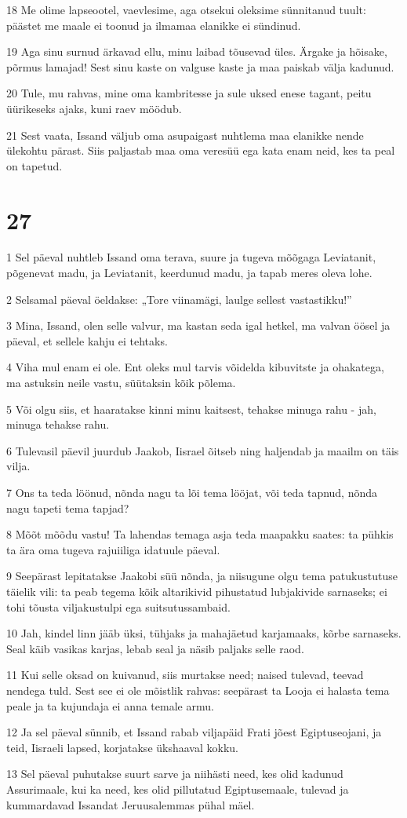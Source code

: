 \par 18 Me olime lapseootel, vaevlesime, aga otsekui oleksime sünnitanud tuult: päästet me maale ei toonud ja ilmamaa elanikke ei sündinud.
\par 19 Aga sinu surnud ärkavad ellu, minu laibad tõusevad üles. Ärgake ja hõisake, põrmus lamajad! Sest sinu kaste on valguse kaste ja maa paiskab välja kadunud.
\par 20 Tule, mu rahvas, mine oma kambritesse ja sule uksed enese tagant, peitu üürikeseks ajaks, kuni raev möödub.
\par 21 Sest vaata, Issand väljub oma asupaigast nuhtlema maa elanikke nende ülekohtu pärast. Siis paljastab maa oma veresüü ega kata enam neid, kes ta peal on tapetud.

\chapter{27}

\par 1 Sel päeval nuhtleb Issand oma terava, suure ja tugeva mõõgaga Leviatanit, põgenevat madu, ja Leviatanit, keerdunud madu, ja tapab meres oleva lohe.
\par 2 Selsamal päeval öeldakse: „Tore viinamägi, laulge sellest vastastikku!”
\par 3 Mina, Issand, olen selle valvur, ma kastan seda igal hetkel, ma valvan öösel ja päeval, et sellele kahju ei tehtaks.
\par 4 Viha mul enam ei ole. Ent oleks mul tarvis võidelda kibuvitste ja ohakatega, ma astuksin neile vastu, süütaksin kõik põlema.
\par 5 Või olgu siis, et haaratakse kinni minu kaitsest, tehakse minuga rahu - jah, minuga tehakse rahu.
\par 6 Tulevasil päevil juurdub Jaakob, Iisrael õitseb ning haljendab ja maailm on täis vilja.
\par 7 Ons ta teda löönud, nõnda nagu ta lõi tema lööjat, või teda tapnud, nõnda nagu tapeti tema tapjad?
\par 8 Mõõt mõõdu vastu! Ta lahendas temaga asja teda maapakku saates: ta pühkis ta ära oma tugeva rajuiiliga idatuule päeval.
\par 9 Seepärast lepitatakse Jaakobi süü nõnda, ja niisugune olgu tema patukustutuse täielik vili: ta peab tegema kõik altarikivid pihustatud lubjakivide sarnaseks; ei tohi tõusta viljakustulpi ega suitsutussambaid.
\par 10 Jah, kindel linn jääb üksi, tühjaks ja mahajäetud karjamaaks, kõrbe sarnaseks. Seal käib vasikas karjas, lebab seal ja näsib paljaks selle raod.
\par 11 Kui selle oksad on kuivanud, siis murtakse need; naised tulevad, teevad nendega tuld. Sest see ei ole mõistlik rahvas: seepärast ta Looja ei halasta tema peale ja ta kujundaja ei anna temale armu.
\par 12 Ja sel päeval sünnib, et Issand rabab viljapäid Frati jõest Egiptuseojani, ja teid, Iisraeli lapsed, korjatakse ükshaaval kokku.
\par 13 Sel päeval puhutakse suurt sarve ja niihästi need, kes olid kadunud Assurimaale, kui ka need, kes olid pillutatud Egiptusemaale, tulevad ja kummardavad Issandat Jeruusalemmas pühal mäel.

